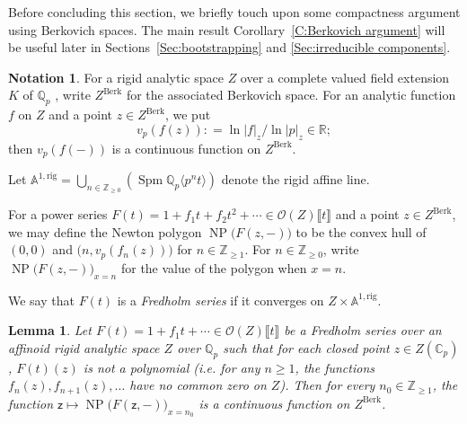 \documentclass[12pt]{amsart}
\newtheorem{lemma}[subsection]{Lemma}
\theoremstyle{definition}
\newtheorem{notation}[subsection]{Notation}
\numberwithin{equation}{subsection}
\def\calO{\mathcal{O}}
\def\AAA{\mathbb{A}}
\def\CC{\mathbb{C}}
\def\QQ{\mathbb{Q}}
\def\RR{\mathbb{R}}
\def\ZZ{\mathbb{Z}}
\def\sfz{\mathsf{z}}
\DeclareMathOperator{\NP}{NP}
\DeclareMathOperator{\Spm}{Spm}
\newcommand{\Berk}{\mathrm{Berk}}
\newcommand{\rig}{\mathrm{rig}}
\begin{document}
				



Before concluding this section, we briefly touch upon some compactness argument using Berkovich spaces. The main result Corollary~\ref{C:Berkovich argument} will be useful later in Sections~\ref{Sec:bootstrapping} and \ref{Sec:irreducible components}.

\begin{notation}
\label{N:Berkovich notation}
For a rigid analytic space $Z$ over a complete valued field extension $K$ of $\QQ_p$
, write $Z^\Berk$ for the associated Berkovich space. 
For an analytic function $f$ on $Z$ and a point $z \in Z^\Berk$, we put
$$
v_p(f(z)) : = \ln |f|_z \big/ \ln |p|_z \in \RR;
$$
then $v_p(f(-))$ is a continuous function on $Z^\Berk$. 

Let $\AAA^{1, \rig} = \bigcup_{n \in \ZZ_{\geq 0}} (\Spm \QQ_p\langle p^nt\rangle )$ denote the rigid affine line.

For a power series $F(t) = 1+ f_1t+ f_2t^2 + \cdots \in \calO(Z)\llbracket t \rrbracket$ and a point $z \in Z^\Berk$, we may define the Newton polygon $\NP\big( F(z,-)\big)$ to be the convex hull of $(0,0)$ and $\big(n, v_p(f_n(z))\big)$ for $n \in \ZZ_{\geq 1}$.  For $n \in \ZZ_{\geq 0}$, write $\NP\big( F(z,-)\big)_{x=n}$ for the value of the polygon when $x=n$.

We say that $F(t)$ is a \emph{Fredholm series} if it converges on $Z \times \AAA^{1, \rig}$.
\end{notation}
\begin{lemma}
\label{L:continuity of NP}
Let $F(t) = 1+ f_1 t+ \cdots  \in \calO(Z)\llbracket t\rrbracket$ be a Fredholm series over an affinoid rigid analytic space $Z$ over $\QQ_p$ such that for each closed point $z \in Z(\CC_p)$, $F(t)(z)$ is not a polynomial (i.e. for any $n \geq 1$, the functions $f_{n}(z), f_{n+1}(z), \dots$ have no common zero on $Z$).
Then for every $n_0 \in \ZZ_{\geq 1}$, the function  $\sfz \mapsto \NP\big( F(\sfz,-)\big)_{x=n_0}$ is a continuous function on $Z^\Berk$.
\end{lemma}
\end{document}

